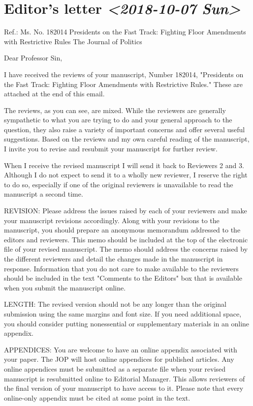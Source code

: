 \documentclass[article,letterpaper,times,12pt,listings-bw,microtype]{article}
\begin{document}
\section{Editor's letter \textit{<2018-10-07 Sun>}}
\label{sec:orgc4fd045}
Ref.:  Ms. No. 182014
Presidents on the Fast Track: Fighting Floor Amendments with Restrictive Rules
The Journal of Politics

Dear Professor Sin,

I have received the reviews of your manuscript, Number 182014, "Presidents on the Fast Track: Fighting Floor Amendments with Restrictive Rules." These are attached at the end of this email. 

The reviews, as you can see, are mixed. While the reviewers are generally sympathetic to what you are trying to do and your general approach to the question, they also raise a variety of important concerns and offer several useful suggestions. Based on the reviews and my own careful reading of the manuscript, I invite you to revise and resubmit your manuscript for further review.

When I receive the revised manuscript I will send it back to Reviewers 2 and 3. Although I do not expect to send it to a wholly new reviewer, I reserve the right to do so, especially if one of the original reviewers is unavailable to read the manuscript a second time.

REVISION: Please address the issues raised by each of your reviewers and make your manuscript revisions accordingly. Along with your revisions to the manuscript, you should prepare an anonymous memorandum addressed to the editors and reviewers. This memo should be included at the top of the electronic file of your revised manuscript. The memo should address the concerns raised by the different reviewers and detail the changes made in the manuscript in response. Information that you do not care to make available to the reviewers should be included in the text "Comments to the Editors" box that is available when you submit the manuscript online.

LENGTH: The revised version should not be any longer than the original submission using the same margins and font size. If you need additional space, you should consider putting nonessential or supplementary materials in an online appendix.

APPENDICES: You are welcome to have an online appendix associated with your paper. The JOP will host online appendices for published articles. Any online appendices must be submitted as a separate file when your revised manuscript is resubmitted online to Editorial Manager. This allows reviewers of the final version of your manuscript to have access to it. Please note that every online-only appendix must be cited at some point in the text.
\end{document}
